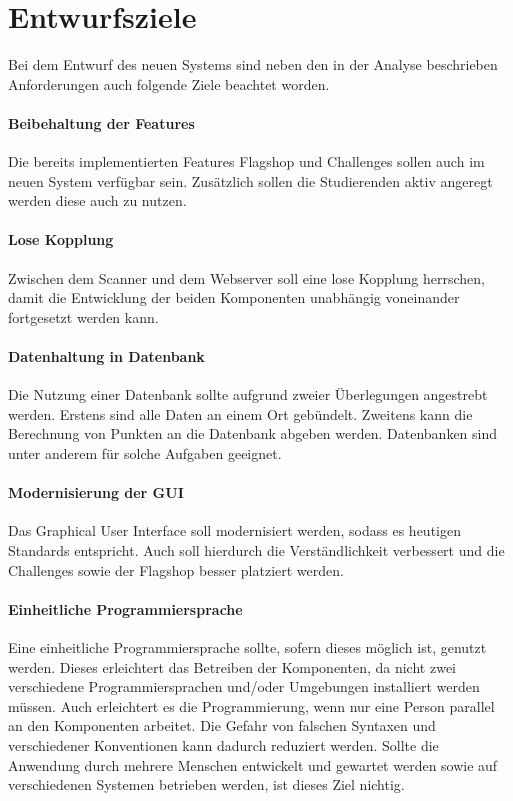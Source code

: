 \section{Entwurfsziele} \label{sec:Entwurfsziele}

Bei dem Entwurf des neuen Systems sind neben den in der Analyse beschrieben Anforderungen auch folgende Ziele beachtet worden.

\paragraph{Beibehaltung der Features}
Die bereits implementierten Features Flagshop und Challenges sollen auch im neuen System verfügbar sein. Zusätzlich sollen die Studierenden aktiv angeregt werden diese auch zu nutzen.

\paragraph{Lose Kopplung}
Zwischen dem Scanner und dem Webserver soll eine lose Kopplung herrschen, damit die Entwicklung der beiden Komponenten unabhängig voneinander fortgesetzt werden kann.

\paragraph{Datenhaltung in Datenbank}
Die Nutzung einer Datenbank sollte aufgrund zweier Überlegungen angestrebt werden. Erstens sind alle Daten an einem Ort gebündelt. Zweitens kann die Berechnung von Punkten an die Datenbank abgeben werden. Datenbanken sind unter anderem für solche Aufgaben geeignet.

\paragraph{Modernisierung der GUI}
Das Graphical User Interface soll modernisiert werden, sodass es heutigen Standards entspricht. Auch soll hierdurch die Verständlichkeit verbessert und die Challenges sowie der Flagshop besser platziert werden.

\paragraph{Einheitliche Programmiersprache}
Eine einheitliche Programmiersprache sollte, sofern dieses möglich ist, genutzt werden. Dieses erleichtert das Betreiben der Komponenten, da nicht zwei verschiedene Programmiersprachen und/oder Umgebungen installiert werden müssen. Auch erleichtert es die Programmierung, wenn nur eine Person parallel an den Komponenten arbeitet. Die Gefahr von falschen Syntaxen und verschiedener Konventionen kann dadurch reduziert werden. Sollte die Anwendung durch mehrere Menschen entwickelt und gewartet werden sowie auf verschiedenen Systemen betrieben werden, ist dieses Ziel nichtig.

